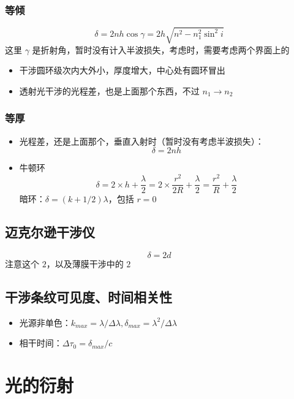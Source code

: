 \documentclass{article}
\begin{document}
\subsubsection{等倾}

$$
    \delta=2nh\cos\gamma=2h\sqrt{n^2-n_1^2\sin^2i}
$$
这里 $\gamma$ 是折射角，暂时没有计入半波损失，考虑时，需要考虑两个界面上的~
\begin{itemize}
    \item 干涉圆环级次内大外小，厚度增大，中心处有圆环冒出
    \item 透射光干涉的光程差，也是上面那个东西，不过 $n_1\to n_2$
\end{itemize}

\subsubsection{等厚}

\begin{itemize}
    \item 光程差，还是上面那个，垂直入射时（暂时没有考虑半波损失）：$$
              \delta=2nh
          $$
    \item 牛顿环 $$
              \delta=2\times h+\frac{\lambda}{2}=2\times \frac{r^2}{2R}+\frac{\lambda}{2}=\frac{r^2}{R}+\frac{\lambda}{2}
          $$ 暗环：$\delta=(k+1/2)\lambda$，包括 $r=0$
\end{itemize}

\subsection{迈克尔逊干涉仪}

$$
    \delta=2d
$$
注意这个 $2$，以及薄膜干涉中的 $2$

\subsection{干涉条纹可见度、时间相关性}

\begin{itemize}
    \item 光源非单色：$k_{max}=\lambda/\Delta\lambda, \delta_{max}=\lambda^2/\Delta\lambda$
    \item 相干时间：$\Delta\tau_0=\delta_{max}/c$
\end{itemize}

\section{光的衍射}
\end{document}
